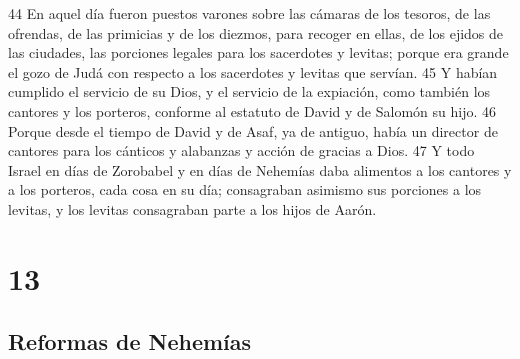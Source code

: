 44 En aquel día fueron puestos varones sobre las cámaras de los tesoros, de las ofrendas, de las primicias y de los diezmos, para recoger en ellas, de los ejidos de las ciudades, las porciones legales para los sacerdotes y levitas; porque era grande el gozo de Judá con respecto a los sacerdotes y levitas que servían.
45 Y habían cumplido el servicio de su Dios, y el servicio de la expiación, como también los cantores y los porteros, conforme al estatuto de David y de Salomón su hijo.
46 Porque desde el tiempo de David y de Asaf, ya de antiguo, había un director de cantores para los cánticos y alabanzas y acción de gracias a Dios.
47 Y todo Israel en días de Zorobabel y en días de Nehemías daba alimentos a los cantores y a los porteros, cada cosa en su día; consagraban asimismo sus porciones a los levitas, y los levitas consagraban parte a los hijos de Aarón.

\chapter{13}

\section*{Reformas de Nehemías}


